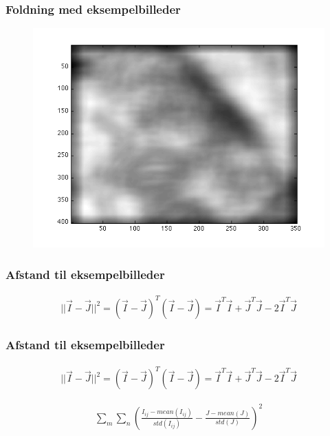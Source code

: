 \begin{frame}
\frametitle{Foldning med eksempelbilleder}

\begin{figure}[H]
	\centering
	\includegraphics[scale=0.6]{img/finalmethod/convolve.png}
\end{figure}
\end{frame}

\begin{frame}
\frametitle{Afstand til eksempelbilleder}
\begin{align*}
	||\vec{I}-\vec{J}||^2 = (\vec{I}-\vec{J})^T(\vec{I}-\vec{J}) = \vec{I}^T\vec{I} + \vec{J}^T\vec{J}-2\vec{I}^T\vec{J}
\end{align*}
\end{frame}

\begin{frame}
\frametitle{Afstand til eksempelbilleder}
\begin{align*}
	||\vec{I}-\vec{J}||^2 = (\vec{I}-\vec{J})^T(\vec{I}-\vec{J}) = \vec{I}^T\vec{I} + \vec{J}^T\vec{J}-2\vec{I}^T\vec{J}
\end{align*}

\begin{align*}
	\sum_m\sum_n \left(\frac{I_{ij}-mean(I_{ij})}{std(I_{ij})}-\frac{J-mean(J)}{std(J)}\right)^2
\end{align*}
\end{frame}
